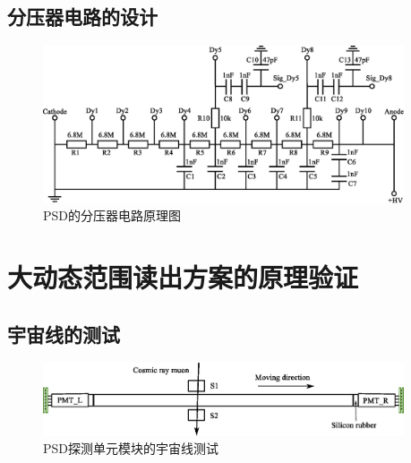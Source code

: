 \subsection{分压器电路的设计}
\label{sec:dynamic_range:hv_divider}

\begin{figure}[!htbp]
	\centering
	\includegraphics[width=0.95\textwidth]{chap/dynamic_range/fig/divider.eps}
	\caption{PSD的分压器电路原理图}
	\label{fig:dynamic_range:divider}
\end{figure}

\section{大动态范围读出方案的原理验证}
\label{sec:dynamic_range:verification}


\subsection{宇宙线的测试}
\label{sec:dynamic_range:cosmic_ray}

\begin{figure}[!htbp]
	\centering
	\includegraphics[width=0.95\textwidth]{chap/dynamic_range/fig/cosmic_test.eps}
	\caption{PSD探测单元模块的宇宙线测试}
	\label{fig:dynamic_range:cosmic_test}
\end{figure}

